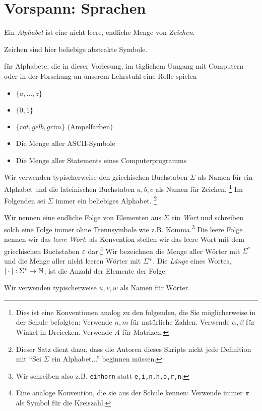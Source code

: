 \section[Vorspann: Sprachen]{Vorspann: Sprachen}
\begin{Def}[name={[Alphabet $\Sigma$]}]
	Ein \emph{Alphabet} ist eine nicht leere, endliche Menge von \emph{Zeichen}.
\end{Def} %
Zeichen sind hier beliebige abstrakte Symbole.

\newcommand{\aro}{\textit{rot}}
\newcommand{\age}{\textit{gelb}}
\newcommand{\agr}{\textit{grün}}

\begin{Bsp*} für Alphabete, die in dieser Vorlesung, im täglichem Umgang mit Computern oder in der Forschung an unserem Lehrstuhl eine Rolle spielen
  \begin{itemize}
  \item $\{a,\dots,z\}$
  \item $\{0, 1\}$
  \item $\{\aro, \age, \agr\}$ (Ampelfarben)
  \item Die Menge aller ASCII-Symbole
  \item Die Menge aller Statements eines Computerprogramms
  \qedhere
  \end{itemize}
\end{Bsp*}
Wir verwenden typischerweise den griechischen Buchstaben $\Sigma$ als Namen für ein Alphabet und die lateinischen Buchstaben $a,b,c$ als Namen für Zeichen.%
\footnote{Dies ist eine Konventionen analog zu den folgenden, die Sie möglicherweise in der Schule befolgten: Verwende $n,m$ für natürliche Zahlen. Verwende $\alpha, \beta$ für Winkel in Dreiecken. Verwende $A$ für Matrizen.}
Im Folgenden sei $\Sigma$ immer ein beliebiges Alphabet.%
\footnote{Dieser Satz dient dazu, dass die Autoren dieses Skripts nicht jede Definition mit ``Sei $\Sigma$ ein Alphabet...'' beginnen müssen.}

\begin{Def}[name={[Wort $w$ über $\Sigma$]}]\label{def:1.2}
  Wir nennen eine endliche Folge von Elementen aus $\Sigma$ ein \emph{Wort}
  und schreiben solch eine Folge immer ohne Trennsymbole wie z.B. Komma.\footnote{Wir schreiben also z.B. \texttt{einhorn} statt \texttt{e,i,n,h,o,r,n}.}
  Die leere Folge nennen wir das \emph{leere Wort}; als Konvention stellen wir das leere Wort mit dem griechischen Buchstaben $\varepsilon$ dar.\footnote{Eine analoge Konvention, die sie aus der Schule kennen: Verwende immer $\pi$ als Symbol für die Kreiszahl.}
  Wir bezeichnen die Menge aller Wörter mit $\Sigma^*$ und die Menge aller nicht leeren Wörter mit $\Sigma^+$.
  Die \emph{Länge} eines Wortes, $|\cdot| : \Sigma^* \to \mathbb{N}$, ist die Anzahl der Elemente der Folge.
\end{Def}
  Wir verwenden typischerweise $u,v,w$ als Namen für Wörter.

